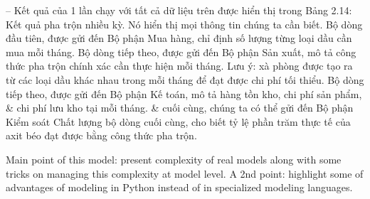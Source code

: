 \documentclass{article}
\begin{document}
\begin{itemize}
\begin{itemize}
\begin{itemize}
\begin{itemize}
                -- Kết quả của 1 lần chạy với tất cả dữ liệu trên được hiển thị trong {\sf Bảng 2.14: Kết quả pha trộn nhiều kỳ}. Nó hiển thị mọi thông tin chúng ta cần biết. Bộ dòng đầu tiên, được gửi đến Bộ phận Mua hàng, chỉ định số lượng từng loại dầu cần mua mỗi tháng. Bộ dòng tiếp theo, được gửi đến Bộ phận Sản xuất, mô tả công thức pha trộn chính xác cần thực hiện mỗi tháng. Lưu ý: xà phòng được tạo ra từ các loại dầu khác nhau trong mỗi tháng để đạt được chi phí tối thiểu. Bộ dòng tiếp theo, được gửi đến Bộ phận Kế toán, mô tả hàng tồn kho, chi phí sản phẩm, \& chi phí lưu kho tại mỗi tháng. \& cuối cùng, chúng ta có thể gửi đến Bộ phận Kiểm soát Chất lượng bộ dòng cuối cùng, cho biết tỷ lệ phần trăm thực tế của axit béo đạt được bằng công thức pha trộn.

                Main point of this model: present complexity of real models along with some tricks on managing this complexity at model level. A 2nd point: highlight some of advantages of modeling in Python instead of in specialized modeling languages.


\end{itemize}
\end{itemize}
\end{itemize}
\end{itemize}
\end{document}
